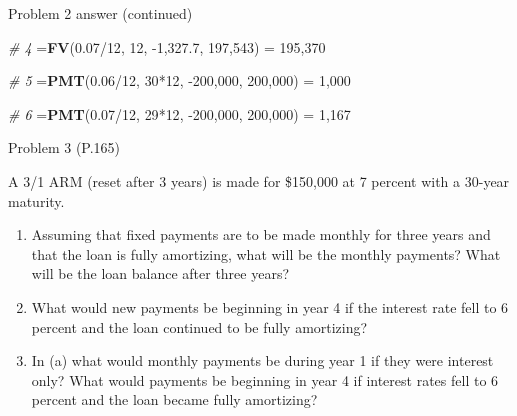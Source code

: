 \documentclass[ignorenonframetext,]{beamer}
\newenvironment{Shaded}{\begin{snugshade}}{\end{snugshade}}
\newcommand{\KeywordTok}[1]{\textcolor[rgb]{0.13,0.29,0.53}{\textbf{{#1}}}}
\newcommand{\DecValTok}[1]{\textcolor[rgb]{0.00,0.00,0.81}{{#1}}}
\newcommand{\FloatTok}[1]{\textcolor[rgb]{0.00,0.00,0.81}{{#1}}}
\newcommand{\StringTok}[1]{\textcolor[rgb]{0.31,0.60,0.02}{{#1}}}
\newcommand{\CommentTok}[1]{\textcolor[rgb]{0.56,0.35,0.01}{\textit{{#1}}}}
\newcommand{\NormalTok}[1]{{#1}}
\providecommand{\tightlist}{%
\setlength{\itemsep}{0pt}\setlength{\parskip}{0pt}}
\begin{document}
\begin{frame}[fragile]{Problem 2 answer (continued)}

\begin{Shaded}
\begin{Highlighting}[]
\CommentTok{# 4}
\NormalTok{=}\KeywordTok{FV}\NormalTok{(}\FloatTok{0.07}\NormalTok{/}\DecValTok{12}\NormalTok{, }\DecValTok{12}\NormalTok{, -}\DecValTok{1}\NormalTok{,}\FloatTok{327.7}\NormalTok{, }\DecValTok{197}\NormalTok{,}\DecValTok{543}\NormalTok{) =}\StringTok{ }\DecValTok{195}\NormalTok{,}\DecValTok{370}

\CommentTok{# 5 }
\NormalTok{=}\KeywordTok{PMT}\NormalTok{(}\FloatTok{0.06}\NormalTok{/}\DecValTok{12}\NormalTok{, }\DecValTok{30}\NormalTok{*}\DecValTok{12}\NormalTok{, -}\DecValTok{200}\NormalTok{,}\DecValTok{000}\NormalTok{, }\DecValTok{200}\NormalTok{,}\DecValTok{000}\NormalTok{) =}\StringTok{ }\DecValTok{1}\NormalTok{,}\DecValTok{000}

\CommentTok{# 6}
\NormalTok{=}\KeywordTok{PMT}\NormalTok{(}\FloatTok{0.07}\NormalTok{/}\DecValTok{12}\NormalTok{, }\DecValTok{29}\NormalTok{*}\DecValTok{12}\NormalTok{, -}\DecValTok{200}\NormalTok{,}\DecValTok{000}\NormalTok{, }\DecValTok{200}\NormalTok{,}\DecValTok{000}\NormalTok{) =}\StringTok{ }\DecValTok{1}\NormalTok{,}\DecValTok{167}
\end{Highlighting}
\end{Shaded}

\normalsize

\end{frame}

\begin{frame}{Problem 3 (P.165)}

\small

A 3/1 ARM (reset after 3 years) is made for \$150,000 at 7 percent with
a 30-year maturity.

\begin{enumerate}
\def\labelenumi{\alph{enumi}.}
\tightlist
\item
  Assuming that fixed payments are to be made monthly for three years
  and that the loan is fully amortizing, what will be the monthly
  payments? What will be the loan balance after three years?
\item
  What would new payments be beginning in year 4 if the interest rate
  fell to 6 percent and the loan continued to be fully amortizing?
\item
  In (a) what would monthly payments be during year 1 if they were
  interest only? What would payments be beginning in year 4 if interest
  rates fell to 6 percent and the loan became fully amortizing?
\end{enumerate}

\end{frame}
\end{document}
